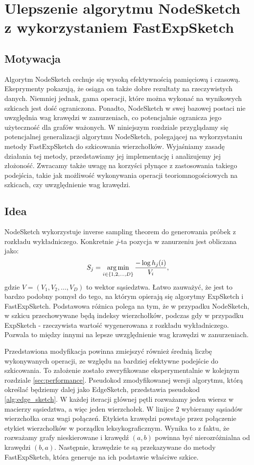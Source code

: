 \chapter{Ulepszenie algorytmu NodeSketch z wykorzystaniem FastExpSketch}
\section{Motywacja}
    Algorytm NodeSketch cechuje się wysoką efektywnością pamięciową i czasową. Ekeprymenty pokazują, że osiąga on także dobre rezultaty na rzeczywistych danych\cite{Yang_Rosso_Li_Cudre-Mauroux_2019}. 
    Niemniej jednak, gama operacji, które można wykonać na wynikowych szkicach jest dość ograniczona. Ponadto, NodeSketch w swej bazowej postaci nie uwzględnia wag krawędzi w zanurzeniach, co potencjalnie ogranicza jego użyteczność dla grafów ważonych.   
    W niniejszym rozdziale przyglądamy się potencjalnej generalizacji algorytmu NodeSketch, polegającej na wykorzystaniu metody FastExpSketch do szkicowania wierzchołków. Wyjaśniamy zasadę działania tej metody, przedstawiamy jej implementację i analizujemy jej złożoność. Zwracamy także uwagę na korzyści płynące z zastosowania takiego podejścia, takie jak możliwość wykonywania operacji teoriomnogościowych na szkicach, czy uwzględnienie wag krawędzi.

\section{Idea}
    NodeSketch wykorzystuje inverse sampling theorem do generowania próbek z rozkładu wykładniczego. Konkretnie $j$-ta pozycja w zanurzeniu jest obliczana jako: 
    \[  
        S_j = \operatorname*{arg\,min}_{i \in \{1,2,\dots, D\}} \frac{-\log h_{j}(i)}{V_i},
    \] 
    gdzie $V = (V_1, V_2, \dots, V_D)$ to wektor sąsiedztwa. Łatwo zauważyć, że jest to bardzo podobny pomysł do tego, na którym opierają się algorytmy ExpSketch i FastExpSketch. Podstawowa różnica polega na tym, że w przypadku NodeSketch, w szkicu przechowywane będą indeksy wierzchołków, podczas gdy w przypadku ExpSketch - rzeczywista wartość wygenerowana z rozkładu wykładniczego. Pozwala to między innymi na lepsze uwzględnienie wag krawędzi w zanurzeniach.

    Przedstawiona modyfikacja powinna zmiejszyć również średnią liczbę wykonywanych operacji, ze względu na bardziej efektywne podejście do szkicowania. To założenie zostało zweryfikowane eksperymentalnie w kolejnym rozdziale \ref{sec:performance}. Pseudokod zmodyfikowanej wersji algorytmu, którą określać będziemy dalej jako EdgeSketch, przedstawia pseudokod \ref{alg:edge_sketch}. W każdej iteracji głównej pętli rozważamy jeden wiersz w macierzy sąsiedztwa, a więc jeden  wierzchołek. W linijce $2$ wybieramy sąsiadów wierzchołka oraz wagi połączeń. Etykieta krawędzi powstaje przez połączenie etykiet wierzchołków w porządku leksykograficznym. Wynika to z faktu, że rozważamy grafy nieskierowane i krawędź $(a,b)$ powinna być nierozróżnialna od krawędzi $(b,a)$. Następnie, krawędzie te są przekazywane do metody FastExpSketch, która generuje na ich podstawie właściwe szkice.  

